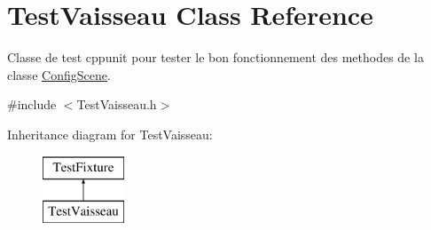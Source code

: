 \hypertarget{class_test_vaisseau}{\section{Test\-Vaisseau Class Reference}
\label{class_test_vaisseau}
}


Classe de test cppunit pour tester le bon fonctionnement des methodes de la classe \hyperlink{class_config_scene}{Config\-Scene}.  




{\ttfamily \#include $<$Test\-Vaisseau.\-h$>$}

Inheritance diagram for Test\-Vaisseau\-:\begin{figure}[H]
\begin{center}
\leavevmode
\includegraphics[height=2.000000cm]{class_test_vaisseau}
\end{center}
\end{figure}
